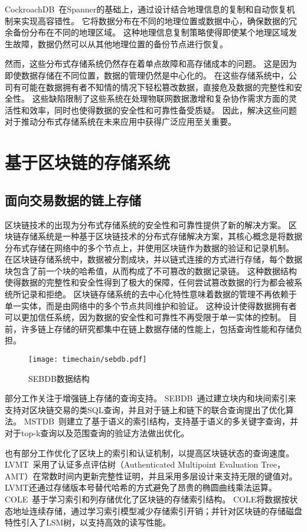 CockroachDB~\cite{taft2020cockroachdb}在Spanner的基础上，通过设计结合地理信息的复制和自动恢复机制来实现高容错性。
它将数据分布在不同的地理位置或数据中心，确保数据的冗余备份分布在不同的地理区域。
这种地理信息复制策略使得即使某个地理区域发生故障，数据仍然可以从其他地理位置的备份节点进行恢复。

然而，这些分布式存储系统仍然存在着单点故障和高存储成本的问题。
这是因为即使数据存储在不同位置，数据的管理仍然是中心化的。
在这些存储系统中，公司有可能在数据拥有者不知情的情况下轻松篡改数据，直接危及数据的完整性和安全性。
这些缺陷限制了这些系统在处理物联网数据激增和复杂协作需求方面的灵活性和效率，同时也使得数据的安全性和可靠性备受质疑。
因此，解决这些问题对于推动分布式存储系统在未来应用中获得广泛应用至关重要。

\section{基于区块链的存储系统}

\subsection{面向交易数据的链上存储}
区块链技术的出现为分布式存储系统的安全性和可靠性提供了新的解决方案。
区块链存储系统是一种基于区块链技术的分布式存储解决方案，其核心概念是将数据分布式存储在网络中的多个节点上，并使用区块链作为数据的验证和记录机制。
在区块链存储系统中，数据被分割成块，并以链式连接的方式进行存储，每个数据块包含了前一个块的哈希值，从而构成了不可篡改的数据记录链。
这种数据结构使得数据的完整性和安全性得到了极大的保障，任何尝试篡改数据的行为都会被系统所记录和拒绝。
区块链存储系统的去中心化特性意味着数据的管理不再依赖于单一实体，而是由网络中的多个节点共同维护和验证。
这种设计使得数据拥有者可以更加信任系统，因为数据的安全性和可靠性不再受限于单一实体的控制。
目前，许多链上存储的研究都集中在链上数据存储的性能上，包括查询性能和存储负担。

\begin{figure}[t]
    \centering
    \texttt{[image: timechain/sebdb.pdf]}
    \caption{SEBDB数据结构}
    \label{fig:sebdb}
\end{figure}

部分工作关注于增强链上存储的查询支持。
SEBDB~\cite{zhu2019sebdb}通过建立块内和块间索引来支持对区块链交易的类SQL查询，并且对于链上和链下的联合查询提出了优化算法。
MSTDB~\cite{zhou2022mstdb}则建立了基于语义的索引结构，支持基于语义的多关键字查询，并对于top-k查询以及范围查询的验证方法做出优化。

也有部分工作优化了区块上的索引和认证机制，以提高区块链状态的查询速度。
LVMT~\cite{li2023lvmt}采用了认证多点评估树（Authenticated Multipoint Evaluation Tree，AMT）在常数时间内更新完整性证明，并且采用多层设计来支持无限的键值对。
LVMT还通过存储版本号替代哈希的方式避免了昂贵的椭圆曲线乘法运算。
COLE~\cite{zhang2024cole}基于学习索引和列存储优化了区块链的存储索引结构。
COLE将数据按状态地址连续存储，通过学习索引模型减少存储索引开销；并针对区块链的存储磁盘特性引入了LSM树，以支持高效的读写性能。

